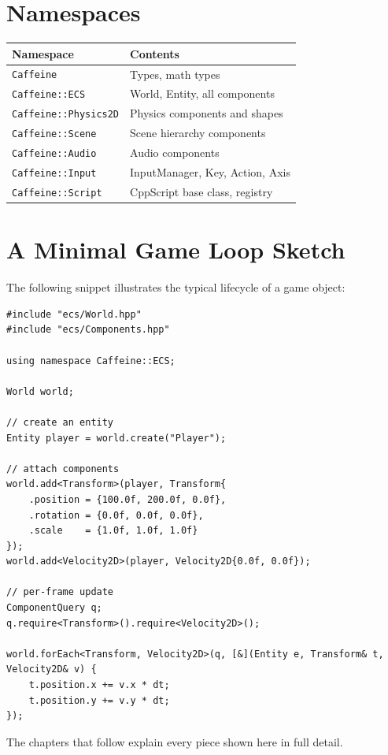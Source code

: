 \section{Namespaces}

\begin{longtable}{ll}
\toprule
\textbf{Namespace} & \textbf{Contents} \\
\midrule
\texttt{Caffeine}              & Types, math types \\
\texttt{Caffeine::ECS}         & World, Entity, all components \\
\texttt{Caffeine::Physics2D}   & Physics components and shapes \\
\texttt{Caffeine::Scene}       & Scene hierarchy components \\
\texttt{Caffeine::Audio}       & Audio components \\
\texttt{Caffeine::Input}       & InputManager, Key, Action, Axis \\
\texttt{Caffeine::Script}      & CppScript base class, registry \\
\bottomrule
\end{longtable}

\section{A Minimal Game Loop Sketch}

The following snippet illustrates the typical lifecycle of a game object:

\begin{lstlisting}
#include "ecs/World.hpp"
#include "ecs/Components.hpp"

using namespace Caffeine::ECS;

World world;

// create an entity
Entity player = world.create("Player");

// attach components
world.add<Transform>(player, Transform{
    .position = {100.0f, 200.0f, 0.0f},
    .rotation = {0.0f, 0.0f, 0.0f},
    .scale    = {1.0f, 1.0f, 1.0f}
});
world.add<Velocity2D>(player, Velocity2D{0.0f, 0.0f});

// per-frame update
ComponentQuery q;
q.require<Transform>().require<Velocity2D>();

world.forEach<Transform, Velocity2D>(q, [&](Entity e, Transform& t, Velocity2D& v) {
    t.position.x += v.x * dt;
    t.position.y += v.y * dt;
});
\end{lstlisting}

The chapters that follow explain every piece shown here in full detail.
